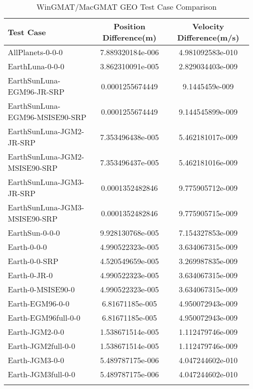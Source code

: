 \begin{table}[htbp!]
\centering
\caption{ WinGMAT/MacGMAT GEO Test Case Comparison}
      \begin{tabular}{lcc}
      \hline\hline
          Test Case & Position Difference(m) & Velocity Difference(m/s) \\
         \hline
         AllPlanets-0-0-0 & 7.889320184e-006 & 4.981092583e-010 \\
         EarthLuna-0-0-0 & 3.862310091e-005 & 2.829034403e-009 \\
         EarthSunLuna-EGM96-JR-SRP & 0.0001255674449 & 9.1445459e-009 \\
         EarthSunLuna-EGM96-MSISE90-SRP & 0.0001255674449 & 9.144545899e-009 \\
         EarthSunLuna-JGM2-JR-SRP & 7.353496438e-005 & 5.462181017e-009 \\
         EarthSunLuna-JGM2-MSISE90-SRP & 7.353496437e-005 & 5.462181016e-009 \\
         EarthSunLuna-JGM3-JR-SRP & 0.0001352482846 & 9.775905712e-009 \\
         EarthSunLuna-JGM3-MSISE90-SRP & 0.0001352482846 & 9.775905715e-009 \\
         EarthSun-0-0-0 & 9.928130768e-005 & 7.154327853e-009 \\
         Earth-0-0-0 & 4.990522323e-005 & 3.634067315e-009 \\
         Earth-0-0-SRP & 4.520549659e-005 & 3.269987835e-009 \\
         Earth-0-JR-0 & 4.990522323e-005 & 3.634067315e-009 \\
         Earth-0-MSISE90-0 & 4.990522323e-005 & 3.634067315e-009 \\
         Earth-EGM96-0-0 & 6.81671185e-005 & 4.950072943e-009 \\
         Earth-EGM96full-0-0 & 6.81671185e-005 & 4.950072943e-009 \\
         Earth-JGM2-0-0 & 1.538671514e-005 & 1.112479746e-009 \\
         Earth-JGM2full-0-0 & 1.538671514e-005 & 1.112479746e-009 \\
         Earth-JGM3-0-0 & 5.489787175e-006 & 4.047244602e-010 \\
         Earth-JGM3full-0-0 & 5.489787175e-006 & 4.047244602e-010 \\
      \hline\hline
      \label{Table: GEO WinGMAT-MacGMAT Table} 
\end{tabular}
\end{table}
